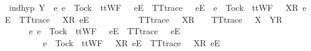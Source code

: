 \begin{isabellebody}
\ ind{\isacharunderscore}hyp{\isacharcolon}\ {\isachardoublequoteopen}Y\ {\isasyminter}\ {\isacharbraceleft}e{\isachardot}\ e\ {\isasymnoteq}\ Tock\ {\isasymand}\ ttWF\ {\isacharparenleft}{\isasymsigma}{\isacharprime}\ {\isacharat}\ {\isacharbrackleft}{\isacharbrackleft}e{\isacharbrackright}\isactrlsub E{\isacharbrackright}{\isacharparenright}\ {\isasymand}\ TT{}{\isacharunderscore}trace\ {\isacharparenleft}{\isasymsigma}{\isacharprime}\ {\isacharat}\ {\isacharbrackleft}{\isacharbrackleft}e{\isacharbrackright}\isactrlsub E{\isacharbrackright}{\isacharparenright}\ {\isasymor}\ e\ {\isacharequal}\ Tock\ {\isasymand}\ ttWF\ {\isacharparenleft}{\isasymsigma}{\isacharprime}\ {\isacharat}\ {\isacharbrackleft}{\isacharbrackleft}X{\isacharbrackright}\isactrlsub R{\isacharcomma}\ {\isacharbrackleft}e{\isacharbrackright}\isactrlsub E{\isacharbrackright}{\isacharparenright}\ {\isasymand}\ TT{}{\isacharunderscore}trace\ {\isacharparenleft}{\isasymsigma}{\isacharprime}\ {\isacharat}\ {\isacharbrackleft}{\isacharbrackleft}X{\isacharbrackright}\isactrlsub R{\isacharcomma}\ {\isacharbrackleft}e{\isacharbrackright}\isactrlsub E{\isacharbrackright}{\isacharparenright}{\isacharbraceright}\ {\isacharequal}\ {\isacharbraceleft}{\isacharbraceright}\ {\isasymLongrightarrow}\isanewline
\ \ \ \ \ \ \ \ TT{}{\isacharunderscore}trace\ {\isacharparenleft}{\isasymsigma}{\isacharprime}\ {\isacharat}\ {\isacharbrackleft}X{\isacharbrackright}\isactrlsub R\ {\isacharhash}\ {\isasymsigma}{\isacharparenright}\ {\isasymLongrightarrow}\ TT{}{\isacharunderscore}trace\ {\isacharparenleft}{\isasymsigma}{\isacharprime}\ {\isacharat}\ {\isacharbrackleft}X\ {\isasymunion}\ Y{\isacharbrackright}\isactrlsub R\ {\isacharhash}\ {\isasymsigma}{\isacharparenright}{\isachardoublequoteclose}\isanewline
\ \ \ \ \isamarkupfalse%
\ {\isachardoublequoteopen}{\isacharbraceleft}e{\isachardot}\ e\ {\isasymnoteq}\ Tock\ {\isasymand}\ ttWF\ {\isacharparenleft}{\isasymsigma}{\isacharprime}\ {\isacharat}\ {\isacharbrackleft}{\isacharbrackleft}e{\isacharbrackright}\isactrlsub E{\isacharbrackright}{\isacharparenright}\ {\isasymand}\ TT{}{\isacharunderscore}trace\ {\isacharparenleft}{\isasymsigma}{\isacharprime}\ {\isacharat}\ {\isacharbrackleft}{\isacharbrackleft}e{\isacharbrackright}\isactrlsub E{\isacharbrackright}{\isacharparenright}\isanewline
\ \ \ \ \ \ \ \ {\isasymor}\ e\ {\isacharequal}\ Tock\ {\isasymand}\ ttWF\ {\isacharparenleft}{\isasymsigma}{\isacharprime}\ {\isacharat}\ {\isacharbrackleft}{\isacharbrackleft}X{\isacharbrackright}\isactrlsub R{\isacharcomma}\ {\isacharbrackleft}e{\isacharbrackright}\isactrlsub E{\isacharbrackright}{\isacharparenright}\ {\isasymand}\ TT{}{\isacharunderscore}trace\ {\isacharparenleft}{\isasymsigma}{\isacharprime}\ {\isacharat}\ {\isacharbrackleft}{\isacharbrackleft}X{\isacharbrackright}\isactrlsub R{\isacharcomma}\ {\isacharbrackleft}e{\isacharbrackright}\isactrlsub E{\isacharbrackright}{\isacharparenright}{\isacharbraceright}\isanewline

\end{isabellebody}
